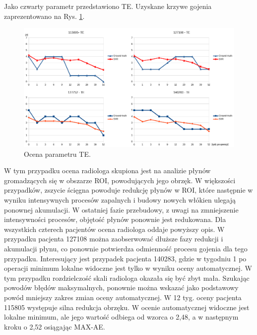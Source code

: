 Jako czwarty parametr przedstawiono TE. Uzyskane krzywe gojenia zaprezentowano na Rys. \ref{fig:TE}.
\begin{figure}[b!]
	\centering
	\includegraphics[width=1\textwidth]{figures/TE.png}
	\caption{Ocena parametru TE.}\label{fig:TE}
\end{figure}
W tym przypadku ocena radiologa skupiona jest na analizie płynów gromadzących się w obszarze ROI, powodujących jego obrzęk. W większości przypadków, zszycie ścięgna powoduje redukcję płynów w ROI, które następnie \linebreak w wyniku intensywnych procesów zapalnych i budowy nowych włókien ulegają ponownej akumulacji. W ostatniej fazie przebudowy, z uwagi na zmniejszenie intensywności procesów, objętość płynów ponownie jest redukowana. Dla wszystkich czterech pacjentów ocena radiologa oddaje powyższy opis. W przypadku pacjenta 127108 można zaobserwować dłuższe fazy redukcji i akumulacji płynu, co ponownie potwierdza odmienność procesu gojenia dla tego przypadku. Interesujący jest przypadek pacjenta 140283, gdzie w tygodniu 1 po operacji minimum lokalne widoczne jest tylko w wyniku oceny automatycznej. W tym przypadku rozdzielczość skali radiologa okazała się być zbyt mała. Szukając powodów błędów maksymalnych, ponownie można wskazać jako podstawowy powód mniejszy zakres zmian oceny automatycznej. W 12 tyg. oceny pacjenta 115805 występuje silna redukcja obrzęku. W ocenie automatycznej widoczne jest lokalne minimum, ale jego wartość odbiega od wzorca o 2,48, a w następnym kroku o 2,52 osiągając MAX-AE. 

